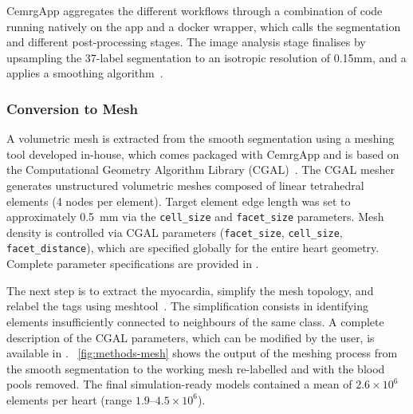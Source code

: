 CemrgApp aggregates the different workflows through a combination of code running natively on the app and 
a docker wrapper, which calls the segmentation and different post-processing stages. 
The image analysis stage finalises by upsampling the 37-label segmentation to an isotropic resolution of 0.15mm, 
and a applies a smoothing algorithm~\cite{crozier2016_segsmooth}. 

\subsubsection{Conversion to Mesh}\label{sec:meshing}
A volumetric mesh is extracted from the smooth segmentation using a meshing tool developed in-house, 
which comes packaged with CemrgApp and is based on the Computational Geometry Algorithm Library (CGAL)~\cite{cgal}. 
The CGAL mesher generates unstructured volumetric meshes 
composed of linear tetrahedral elements (4 nodes per element). Target 
element edge length was set to approximately 0.5~mm via the 
\texttt{cell\_size} and \texttt{facet\_size} parameters. 
Mesh density is controlled via CGAL parameters 
(\texttt{facet\_size}, \texttt{cell\_size}, \texttt{facet\_distance}), 
which are specified globally for the entire heart geometry. Complete
parameter specifications are provided in .

The next step is to extract the myocardia, simplify the mesh topology, and relabel the tags using 
meshtool~\cite{Neic2020-meshtool}.
The simplification consists in identifying elements insufficiently connected to neighbours of the same class.
A complete description of the CGAL parameters, which can be modified by the user,
is available in 
. 
~\ref{fig:methods-mesh} 
shows the output of the meshing process from the smooth segmentation 
to the working mesh re-labelled and with the blood pools removed.
The final simulation-ready models contained a mean of $2.6 \times 10^6$ elements per heart 
(range $1.9$--$4.5 \times 10^6$).

